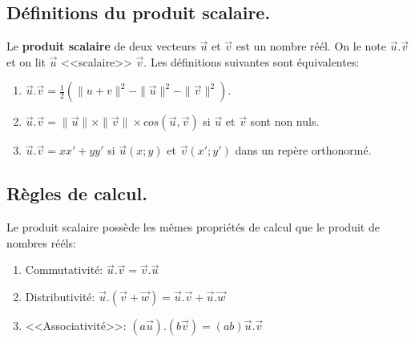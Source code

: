 \documentclass[a4paper,11pt]{article}
\theoremstyle{break}
\begin{document}
 \newpage
 
 \subsection{Définitions du produit scalaire.}
 
 \begin{definition}
  Le \textbf{produit scalaire} de deux vecteurs $\vec{u}$ et $\vec{v}$ est un nombre réél. On le note
  $\vec{u}.\vec{v}$ et on lit $\vec{u}$ <<scalaire>> $\vec{v}$. Les définitions suivantes sont équivalentes:
  
  \begin{enumerate}
   \item $\vec{u}.\vec{v}=\frac{1}{2}(\|u+v\|^2-\|\vec{u}\|^2-\|\vec{v}\|^2)$.
   \item $\vec{u}.\vec{v}=\|\vec{u}\|\times\|\vec{v}\|\times cos(\vec{u},\vec{v})$ si $\vec{u}$ et $\vec{v}$ sont non nuls.
   \item $\vec{u}.\vec{v}=xx'+yy'$ si $\vec{u}(x;y)$ et $\vec{v}(x';y')$ dans un repère orthonormé.
  \end{enumerate}
  
 \end{definition}
 
 \subsection{Règles de calcul.}
 
 Le produit scalaire possède les mêmes propriétés de calcul que le produit de nombres rééls:
 \begin{proposition}
  \begin{enumerate}
   \item Commutativité: $\vec{u}.\vec{v}=\vec{v}.\vec{u}$
   \item Distributivité: $\vec{u}.(\vec{v}+\vec{w})=\vec{u}.\vec{v}+\vec{u}.\vec{w}$
   \item <<Associativité>>: $(a\vec{u}).(b\vec{v})=(ab)\vec{u}.\vec{v}$
  \end{enumerate}

 \end{proposition}
\end{document}
